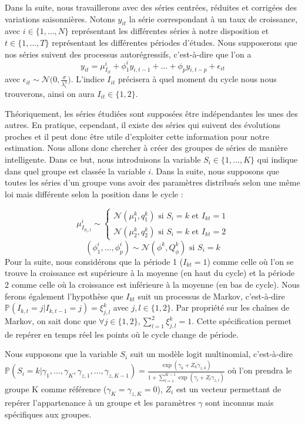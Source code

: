 \documentclass[10pt,french,french]{article}
\begin{document}
Dans la suite, nous travaillerons avec des séries centrées, réduites et corrigées des variations saisonnières.
Notons \(y_{it}\) la série correspondant à un taux de croissance, avec \(i \in \{1, \dots, N\}\) représentant les différentes séries à notre disposition et \(t \in \{1, \dots, T\}\) représentant les différentes périodes d'études.
Nous supposerons que nos séries suivent des processus autorégressifs, c'est-à-dire que l'on a \[ y_{it} = \mu_{I_{it}}^{i} + \phi_1^i y_{i,t-1} + \dots + \phi_p y_{i,t-p} + \epsilon_{it}\] avec \(\epsilon_{it} \sim \mathcal{N}\big(0, \displaystyle\frac{\sigma}{\lambda_i^2}\big)\).
L'indice \(I_{it}\) précisera à quel moment du cycle nous nous trouverons, ainsi on aura \(I_{it} \in \{1,2\}\).

Théoriquement, les séries étudiées sont supposées être indépendantes les unes des autres.
En pratique, cependant, il existe des séries qui suivent des évolutions proches et il peut donc être utile d'exploiter cette information pour notre estimation.
Nous allons donc chercher à créer des groupes de séries de manière intelligente.
Dans ce but, nous introduisons la variable \(S_i \in \{1, \dots, K \}\) qui indique dans quel groupe est classée la variable \(i\).
Dans la suite, nous supposons que toutes les séries d'un groupe vons avoir des paramètres distribués selon une même loi mais différente selon la position dans le cycle :

\[ \mu_{I_{S_i,t}}^i \sim \begin{cases}
\mathcal{N}(\mu_1^k,q_1^k) \text{ si } S_i = k \text{ et } I_{kt} = 1\\
\mathcal{N}(\mu_2^k,q_2^k) \text{ si } S_i = k \text{ et } I_{kt} = 2
\end{cases} \] \[ (\phi_1^i, \dots, \phi_p^i) \sim \mathcal{N}(\phi^k,Q_{\phi}^k) \text{ si } S_i = k\] Pour la suite, nous considérons que la période 1 (\(I_{kt} = 1\)) comme celle où l'on se trouve la croissance est supérieure à la moyenne (en haut du cycle) et la période 2 comme celle où la croissance est inférieure à la moyenne (en bas de cycle).
Nous ferons également l'hypothèse que \(I_{kt}\) suit un processus de Markov, c'est-à-dire \(\mathbb{P}(I_{k,t} = j | I_{k,t-1} = j) = \xi_{j,l}^k\) avec \(j,l \in \{1,2\}\).
Par propriété sur les chaînes de Markov, on sait donc que \(\forall j \in \{1,2\}, \sum\limits_{l=1}^2 \xi_{j,l}^k = 1\).
Cette spécification permet de repérer en temps réel les points où le cycle change de période.

Nous supposons que la variable \(S_i\) suit un modèle logit multinomial, c'est-à-dire \(\mathbb{P}(S_i = k |\gamma_1, \dots, \gamma_K, \gamma_{z,1}, \dots, \gamma_{z,K-1}) = \displaystyle\frac{\exp(\gamma_k + Z_k\gamma_{z,k})}{1 + \sum\limits_{l=1}^{K-1} \exp(\gamma_l + Z_l\gamma_{z,l})}\) où l'on prendra le groupe K comme référence (\(\gamma_K = \gamma_{z,K}=0\)), \(Z_i\) est un vecteur permettant de repérer l'appartenance à un groupe et les paramètres \(\gamma\) sont inconnus mais spécifiques aux groupes.
\end{document}
